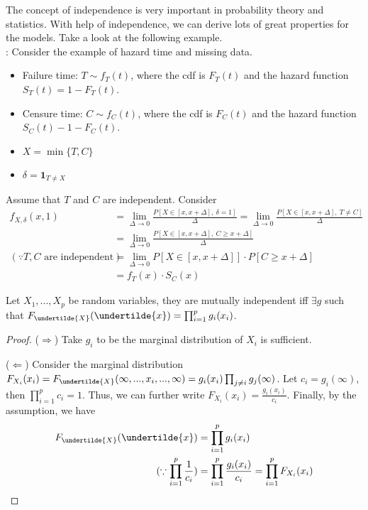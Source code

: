 \documentclass[../MultivariateProbabilityAndRelatedProperties.tex]{subfiles}
\begin{document}
The concept of independence is very important in probability theory and statistics. With help of independence, we can derive lots of great properties for the models. Take a look at the following example.\\

: Consider the example of hazard time and missing data.
\begin{itemize}
	\item Failure time: $T\sim f_T(t)$, where the cdf is $F_T(t)$ and the hazard function $S_T(t) = 1-F_T(t)$.
	\item Censure time: $C\sim f_C(t)$, where the cdf is $F_C(t)$ and the hazard function $S_C(t) - 1-F_C(t)$.
	\item $X = \min\{T,C\}$
	\item $\delta = \mathbf{1}_{T\neq X}$
\end{itemize}
Assume that $T$ and $C$ are independent. Consider
\begin{align*}
f_{X,\delta}(x,1) &= \lim_{\Delta\rightarrow0}\frac{P[X\in[x,x+\Delta],\ \delta=1]}{\Delta}= \lim_{\Delta\rightarrow0}\frac{P[X\in[x,x+\Delta],\ T\neq C]}{\Delta}\\
&= \lim_{\Delta\rightarrow0}\frac{P[X\in[x,x+\Delta],\ C\geq x+\Delta]}{\Delta}\\
(\because T,C\mbox{ are independent})& = \lim_{\Delta\rightarrow0}P[X\in[x,x+\Delta]]\cdot P[C\geq x+\Delta]\\
&=f_T(x)\cdot S_C(x)
\end{align*}

\begin{theorem}
	Let $X_1,...,X_p$ be random variables, they are mutually independent iff $\exists g$ such that $F_{\undertilde{X}}(\undertilde{x}) = \prod_{i=1}^p g_i(x_i)$.
\end{theorem}
\begin{proof}
	
	\noindent($\Rightarrow$) Take $g_i$ to be the marginal distribution of $X_i$ is sufficient.
	
	\noindent($\Leftarrow$) Consider the marginal distribution $F_{X_i}(x_i) = F_{\undertilde{X}}(\infty,...,x_i,...,\infty) = g_i(x_i)\prod_{j\neq i} g_j(\infty)$. Let $c_i = g_i(\infty)$, then $\prod_{i=1}^p c_i = 1$. Thus, we can further write $F_{X_i}(x_i) = \frac{g_i(x_i)}{c_i}$. Finally, by the assumption, we have
	\begin{align*}
	F_{\undertilde{X}}(\undertilde{x}) &= \prod_{i=1}^p g_i(x_i)\\
	(\because \prod_{i=1}^p\frac{1}{c_i})&= \prod_{i=1}^p \frac{g_i(x_i)}{c_i} = \prod_{i=1}^p F_{X_i}(x_i)
	\end{align*}
\end{proof}
\end{document}
